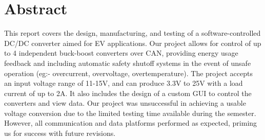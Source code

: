 \section*{Abstract} %

This report covers the design, manufacturing, and testing of a software-controlled DC/DC converter aimed for EV applications. Our project allows for control of up to 4 independent buck-boost converters over CAN, providing energy usage feedback and including automatic safety shutoff systems in the event of unsafe operation (eg:- overcurrent, overvoltage, overtemperature). The project accepts an input voltage range of 11-15V, and can produce 3.3V to 25V with a load current of up to 2A. It also includes the design of a custom GUI to control the converters and view data. Our project was unsuccessful in achieving a usable voltage conversion due to the limited testing time available during the semester. However, all communication and data platforms performed as expected, priming us for success with future revisions.
